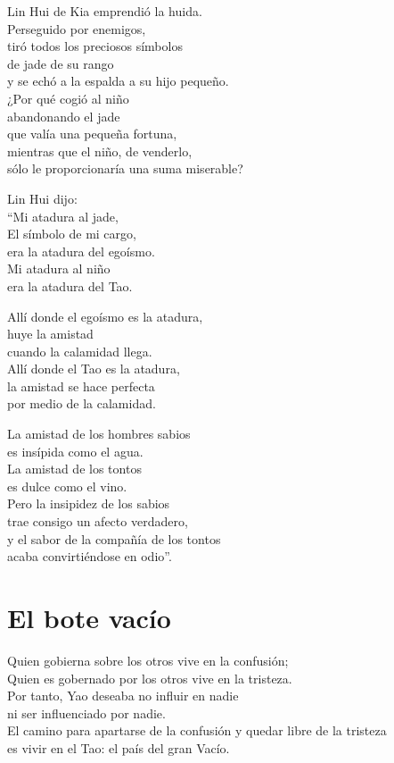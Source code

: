 \documentclass[book,b5paper,hidelinks,final]{memoir}
\begin{document}
	Lin Hui de Kia emprendió la huida.\\
	Perseguido por enemigos,\\
	tiró todos los preciosos símbolos\\
	de jade de su rango\\
	y se echó a la espalda a su hijo pequeño.\\
	¿Por qué cogió al niño\\
	abandonando el jade\\
	que valía una pequeña fortuna,\\
	mientras que el niño, de venderlo,\\
	sólo le proporcionaría una suma miserable?
	
	Lin Hui dijo:\\
	``Mi atadura al jade,\\
	El símbolo de mi cargo,\\
	era la atadura del egoísmo.\\
	Mi atadura al niño\\
	era la atadura del Tao.
	
	Allí donde el egoísmo es la atadura,\\
	huye la amistad\\
	cuando la calamidad llega.\\
	Allí donde el Tao es la atadura,\\
	la amistad se hace perfecta\\
	por medio de la calamidad.
	
	La amistad de los hombres sabios\\
	es insípida como el agua.\\
	La amistad de los tontos\\
	es dulce como el vino.\\
	Pero la insipidez de los sabios\\
	trae consigo un afecto verdadero,\\
	y el sabor de la compañía de los tontos\\
	acaba convirtiéndose en odio''.
	
	\chapter*{El bote vacío}
	
	Quien gobierna sobre los otros vive en la confusión;\\
	Quien es gobernado por los otros vive en la tristeza.\\
	Por tanto, Yao deseaba no influir en nadie\\
	ni ser influenciado por nadie.\\
	El camino para apartarse de la confusión y quedar libre de la tristeza\\
	es vivir en el Tao: el país del gran Vacío.
	
\end{document}
